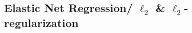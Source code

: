 \subsection{Elastic Net Regression/ $\ell_2$ \& $\ell_2$-regularization \cite{dnn-1,geeksforgeeks.org/regularization-in-machine-learning}} \label{Elastic Net Regression}





























